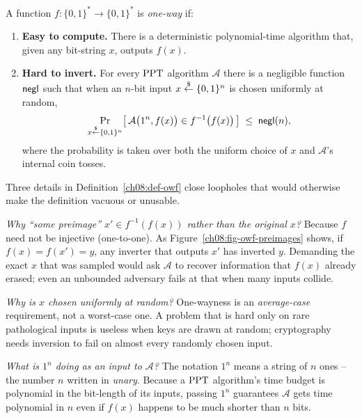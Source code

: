 \begin{definition}
\label{ch08:def-owf}
A function $f : \{0,1\}^{*} \to \{0,1\}^{*}$ is \emph{one-way} if:
\begin{enumerate}
\item \textbf{Easy to compute.} There is a deterministic polynomial-time algorithm that, given any bit-string $x$, outputs $f(x)$.
\item \textbf{Hard to invert.} For every $\mathrm{PPT}$ algorithm $\mathcal A$ there is a negligible function $\mathsf{negl}$ such that when an $n$-bit input $x \stackrel{\$}{\gets} \{0,1\}^{n}$ is chosen uniformly at random,
\[
\Pr_{x \stackrel{\$}{\gets} \{0,1\}^{n}}\bigl[\, \mathcal A\bigl(1^{n}, f(x)\bigr) \in f^{-1}\bigl(f(x)\bigr)\,\bigr] \;\le\; \mathsf{negl}(n),
\]
where the probability is taken over both the uniform choice of $x$ and $\mathcal A$'s internal coin tosses.
\end{enumerate}
\end{definition}

Three details in Definition~\ref{ch08:def-owf} close loopholes that would otherwise make the definition vacuous or unusable.

\begin{walkbox}
\emph{Why ``some preimage'' $x' \in f^{-1}(f(x))$ rather than the original $x$?} Because $f$ need not be injective (one-to-one). As Figure~\ref{ch08:fig-owf-preimages} shows, if $f(x) = f(x') = y$, any inverter that outputs $x'$ has inverted $y$. Demanding the exact $x$ that was sampled would ask $\mathcal A$ to recover information that $f(x)$ already erased; even an unbounded adversary fails at that when many inputs collide.

\medskip
\emph{Why is $x$ chosen uniformly at random?} One-wayness is an \emph{average-case} requirement, not a worst-case one. A problem that is hard only on rare pathological inputs is useless when keys are drawn at random; cryptography needs inversion to fail on almost every randomly chosen input.

\medskip
\emph{What is $1^{n}$ doing as an input to $\mathcal A$?} The notation $1^{n}$ means a string of $n$ ones -- the number $n$ written in \emph{unary}. Because a $\mathrm{PPT}$ algorithm's time budget is polynomial in the bit-length of its inputs, passing $1^{n}$ guarantees $\mathcal A$ gets time polynomial in $n$ even if $f(x)$ happens to be much shorter than $n$ bits.
\end{walkbox}

